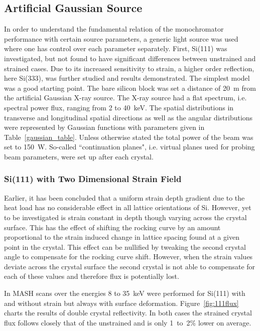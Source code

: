 \documentclass{iucr}
\begin{document}
\subsection{Artificial Gaussian Source}
In order to understand the fundamental relation of the monochromator performance with certain source parameters, a generic light source was used where one has control over each parameter separately. First, Si(111) was investigated, but not found to have significant differences between unstrained and strained cases. Due to its increased sensitivity to strain, a higher order reflection, here Si(333), was further studied and results demonstrated. The simplest model was a good starting point. The bare silicon block was set a distance of 20~m from the artificial Gaussian X-ray source. The X-ray source had a flat spectrum, i.e. spectral power flux, ranging from 2 to 40~keV. The spatial distributions in transverse and longitudinal spatial directions as well as the angular distributions were represented by Gaussian functions with parameters given in Table~\ref{gaussian_table}. Unless otherwise stated the total power of the beam was set to 150~W. So-called ``continuation planes", i.e. virtual planes used for probing beam parameters, were set up after each crystal.

\subsubsection{Si(111) with Two Dimensional Strain Field}\label{111simulation}
Earlier, it has been concluded that a uniform strain depth gradient due to the heat load has no considerable effect in all lattice orientations of Si. However, yet to be investigated is strain constant in depth though varying across the crystal surface. This has the effect of shifting the rocking curve by an amount proportional to the strain induced change in lattice spacing found at a given point in the crystal. This effect can be nullified by tweaking the second crystal angle to compensate for the rocking curve shift. However, when the strain values deviate across the crystal surface the second crystal is not able to compensate for each of these values and therefore flux is potentially lost.


In MASH scans over the energies 8 to 35~keV were performed for Si(111) with and without strain but always with surface deformation. Figure~\ref{fig:111flux} charts the results of double crystal reflectivity. In both cases the strained crystal flux follows closely that of the unstrained and is only 1~to~2\% lower on average.
\end{document}
